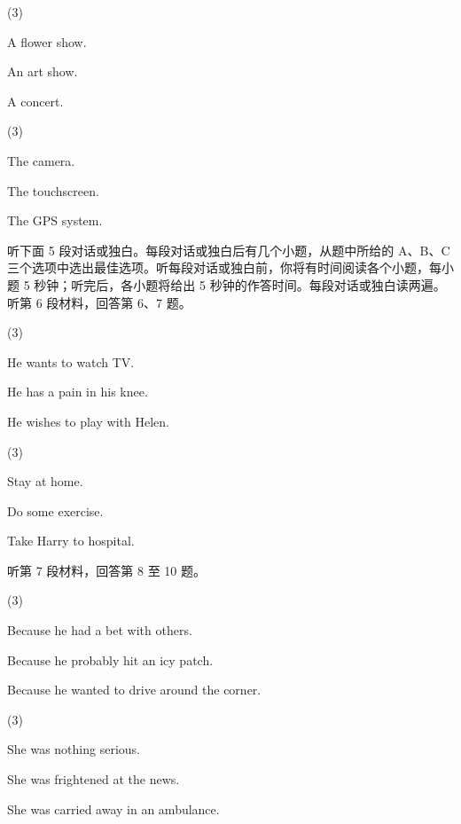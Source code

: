\documentclass{英语试卷}
\begin{document}
\begin{choices}(3)
  \item A flower show.
  \item An art show.
  \item A concert.
\end{choices}
\begin{choices}(3)
  \item The camera.
  \item The touchscreen.
  \item The GPS system.
\end{choices}
\par 听下面 5 段对话或独白。每段对话或独白后有几个小题，从题中所给的 A、B、C 三个选项中选出最佳选项。听每段对话或独白前，你将有时间阅读各个小题，每小题 5 秒钟；听完后，各小题将给出 5 秒钟的作答时间。每段对话或独白读两遍。 听第 6 段材料，回答第 6、7 题。\par
{}
\begin{choices}(3)
  \item He wants to watch TV.
  \item He has a pain in his knee.
  \item He wishes to play with Helen.
\end{choices}
\begin{choices}(3)
  \item Stay at home.
  \item Do some exercise.
  \item Take Harry to hospital.
\end{choices}
\par 听第 7 段材料，回答第 8 至 10 题。\par
{}
\begin{choices}(3)
  \item Because he had a bet with others.
  \item Because he probably hit an icy patch.
  \item Because he wanted to drive around the corner.
\end{choices}
\begin{choices}(3)
  \item She was nothing serious.
  \item She was frightened at the news.
  \item She was carried away in an ambulance.
\end{choices}
\end{document}
